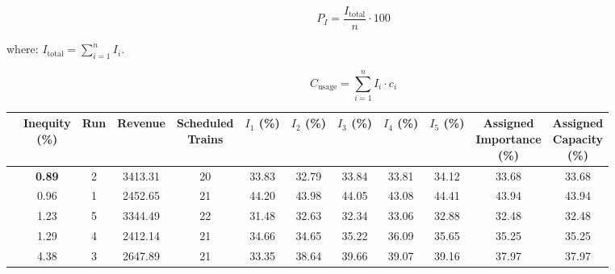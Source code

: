 \documentclass[preprint,12pt]{elsarticle}
\begin{document}
\begin{equation}
P_I = \frac{I_{\text{total}}}{n} \cdot 100
\label{eq:importance_percentage}
\end{equation}

where: $ I_{\text{total}} = \sum_{i=1}^{n}{I_i}$.

\begin{equation}
C_{\text{usage}} = \sum_{i=1}^{n} I_i \cdot c_i
\label{eq:capacity_usage}
\end{equation}

\begin{table}[htbp]
\centering
\begin{adjustbox}{max width=\textwidth}
\begin{tabular}{|c|c|c|c|c|c|c|c|c|c|c|c|}
\cline{2-12}
 \multicolumn{1}{c|}{} & \makecell{\textbf{Inequity} \\ \textbf{(\%)}} & \textbf{Run} & \textbf{Revenue} & \makecell{\textbf{Scheduled} \\ \textbf{Trains}} & \makecell{\textbf{$I_1$} \\ \textbf{(\%)}} & \makecell{\textbf{$I_2$}  \\ \textbf{(\%)}} & \makecell{\textbf{$I_3$}  \\ \textbf{(\%)}} & \makecell{\textbf{$I_4$} \\ \textbf{(\%)}} & \makecell{\textbf{$I_5$} \\ \textbf{(\%)}} & \makecell{\textbf{Assigned} \\ \textbf{Importance} \\ \textbf{(\%)}} & \makecell{\textbf{Assigned} \\ \textbf{Capacity} \\ \textbf{(\%)}} \\ \cline{2-12} \hline

\parbox[t]{2mm}{} & \textbf{0.89} & 2 & 3413.31 & 20 & 33.83 & 32.79 & 33.84 & 33.81 & 34.12 & 33.68 & 33.68 \\ 
& 0.96 & 1 & 2452.65 & 21 & 44.20 & 43.98 & 44.05 & 43.08 & 44.41 & 43.94 & 43.94 \\ 
& 1.23 & 5 & 3344.49 & 22 & 31.48 & 32.63 & 32.34 & 33.06 & 32.88 & 32.48 & 32.48 \\ 
& 1.29 & 4 & 2412.14 & 21 & 34.66 & 34.65 & 35.22 & 36.09 & 35.65 & 35.25 & 35.25 \\ 
& 4.38 & 3 & 2647.89 & 21 & 33.35 & 38.64 & 39.66 & 39.07 & 39.16 & 37.97 & 37.97 \\ \hline


\end{tabular}
\end{adjustbox}
\end{table}
\end{document}

